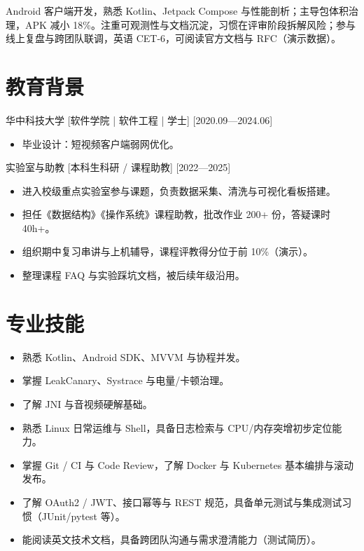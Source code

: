 \documentclass{resume-photo}
\begin{document}

\ResumeTitle

\noindent Android 客户端开发，熟悉 Kotlin、Jetpack Compose 与性能剖析；主导包体积治理，APK 减小 18\%。注重可观测性与文档沉淀，习惯在评审阶段拆解风险；参与线上复盘与跨团队联调，英语 CET-6，可阅读官方文档与 RFC（演示数据）。

\section{教育背景}
\ResumeItem
{华中科技大学}
[\textnormal{软件学院 | 软件工程 | 学士}]
[2020.09—2024.06]

\begin{itemize}
  \item 毕业设计：短视频客户端弱网优化。
\end{itemize}


\ResumeItem
{实验室与助教}
[\textnormal{本科生科研 / 课程助教}]
[2022—2025]

\begin{itemize}
  \item 进入校级重点实验室参与课题，负责数据采集、清洗与可视化看板搭建。
  \item 担任《数据结构》《操作系统》课程助教，批改作业 200+ 份，答疑课时 40h+。
  \item 组织期中复习串讲与上机辅导，课程评教得分位于前 10\%（演示）。
  \item 整理课程 FAQ 与实验踩坑文档，被后续年级沿用。
\end{itemize}



\section{专业技能}
\begin{itemize}
  \item 熟悉 Kotlin、Android SDK、MVVM 与协程并发。
  \item 掌握 LeakCanary、Systrace 与电量/卡顿治理。
  \item 了解 JNI 与音视频硬解基础。
  \item 熟悉 Linux 日常运维与 Shell，具备日志检索与 CPU/内存突增初步定位能力。
  \item 掌握 Git / CI 与 Code Review，了解 Docker 与 Kubernetes 基本编排与滚动发布。
  \item 了解 OAuth2 / JWT、接口幂等与 REST 规范，具备单元测试与集成测试习惯（JUnit/pytest 等）。
  \item 能阅读英文技术文档，具备跨团队沟通与需求澄清能力（测试简历）。
\end{itemize}
\end{document}
